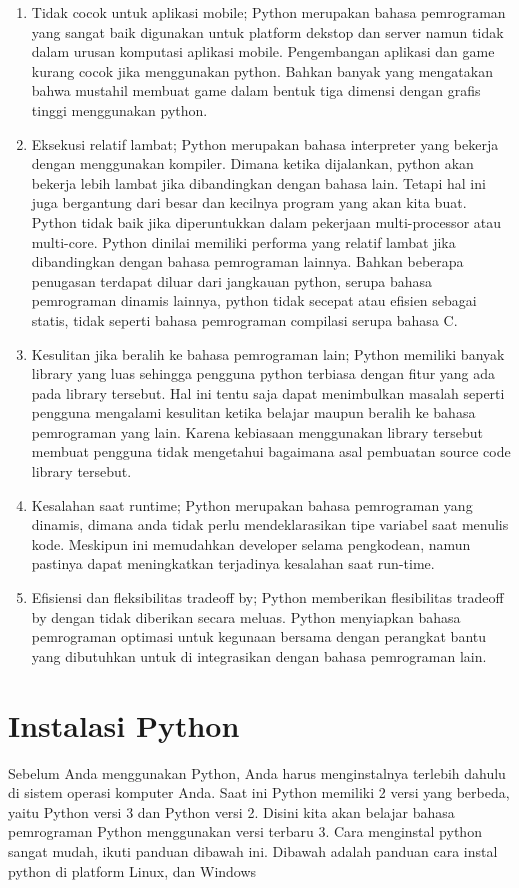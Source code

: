 \begin{enumerate}
\item Tidak cocok untuk aplikasi mobile; Python merupakan bahasa pemrograman yang sangat baik digunakan untuk platform dekstop dan server namun tidak dalam urusan komputasi aplikasi mobile. Pengembangan aplikasi dan game kurang cocok jika menggunakan python. Bahkan banyak yang mengatakan bahwa mustahil membuat game dalam bentuk tiga dimensi dengan grafis tinggi menggunakan python.
\item Eksekusi relatif lambat; Python merupakan bahasa interpreter yang bekerja dengan menggunakan kompiler. Dimana ketika dijalankan, python akan bekerja lebih lambat jika dibandingkan dengan bahasa lain. Tetapi hal ini juga bergantung dari besar dan kecilnya program yang akan kita buat. Python tidak baik jika diperuntukkan dalam pekerjaan multi-processor atau multi-core. Python dinilai memiliki performa yang relatif lambat jika dibandingkan dengan bahasa pemrograman lainnya. Bahkan beberapa penugasan terdapat diluar dari jangkauan python, serupa bahasa pemrograman dinamis lainnya, python tidak secepat atau efisien sebagai statis, tidak seperti bahasa pemrograman compilasi serupa bahasa C.
\item Kesulitan jika beralih ke bahasa pemrograman lain; Python memiliki banyak library yang luas sehingga pengguna python terbiasa dengan fitur yang ada pada library tersebut. Hal ini tentu saja dapat menimbulkan masalah seperti pengguna mengalami kesulitan ketika belajar maupun beralih ke bahasa pemrograman yang lain. Karena kebiasaan menggunakan library tersebut membuat pengguna tidak mengetahui bagaimana asal pembuatan source code library tersebut.
\item Kesalahan saat runtime; Python merupakan bahasa pemrograman yang dinamis, dimana anda tidak perlu mendeklarasikan tipe variabel saat menulis kode. Meskipun ini memudahkan developer selama pengkodean, namun pastinya dapat meningkatkan terjadinya kesalahan saat run-time.
\item Efisiensi dan fleksibilitas tradeoff by; Python memberikan flesibilitas tradeoff by dengan tidak diberikan secara meluas. Python menyiapkan bahasa pemrograman optimasi untuk kegunaan bersama dengan perangkat bantu yang dibutuhkan untuk di integrasikan dengan bahasa pemrograman lain.
\end{enumerate}


\section{Instalasi Python}
Sebelum Anda menggunakan Python, Anda harus menginstalnya terlebih dahulu di sistem operasi komputer Anda. Saat ini Python memiliki 2 versi yang berbeda, yaitu Python versi 3 dan Python versi 2. Disini kita akan belajar bahasa pemrograman Python menggunakan versi terbaru 3. Cara menginstal python sangat mudah, ikuti panduan dibawah ini. Dibawah adalah panduan cara instal python di platform Linux, dan Windows

